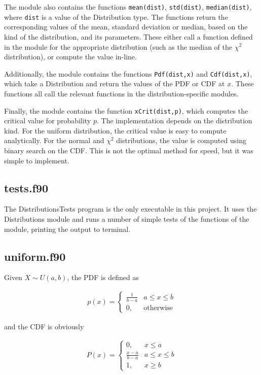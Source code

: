 \documentclass[a4paper]{article}
\begin{document}
The module also contains the functions \verb+mean(dist)+, \verb+std(dist)+, \verb+median(dist)+, where \verb+dist+ is a value of the Distribution type. The functions return the corresponding values of the mean, standard deviation or median, based on the kind of the distribution, and its parameters. These either call a function defined in the module for the appropriate distribution (such as the median of the $\chi^2$ distribution), or compute the value in-line.

Additionally, the module contains the functions \verb+Pdf(dist,x)+ and \verb+Cdf(dist,x)+, which take a Distribution and return the values of the PDF or CDF at $x$. These functions all call the relevant functions in the distribution-specific modules.

Finally, the module contains the function \verb+xCrit(dist,p)+, which computes the critical value for probability $p$. The implementation depends on the distribution kind. For the uniform distribution, the critical value is easy to compute analytically. For the normal and $\chi^2$ distributions, the value is computed using binary search on the CDF. This is not the optimal method for speed, but it was simple to implement.

\subsection{tests.f90}

The DistributionsTests program is the only executable in this project. It uses the Distributions module and runs a number of simple tests of the functions of the module, printing the output to terminal.

\subsection{uniform.f90}

Given $X \sim U(a,b)$, the PDF is defined as

\begin{align}
    p(x) = \left\{ \begin{array}{ll}
        \frac{1}{b-a} & a \le x \le b \\
        0, & \text{otherwise}
    \end{array} \right.
\end{align}

and the CDF is obviously

\begin{align}
    P(x) = \left\{ \begin{array}{ll}
        0, & x \le a \\
        \frac{x-a}{b-a} & a \le x \le b \\
        1, & x \ge b
    \end{array} \right.
\end{align}
\end{document}
